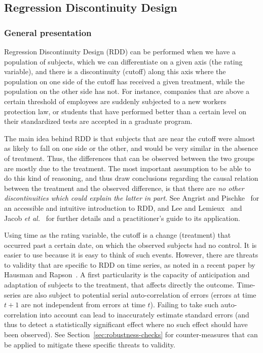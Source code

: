 \subsection{Regression Discontinuity Design}

\label{sec:rdd}

\subsubsection{General presentation}

Regression Discontinuity Design (RDD) can be performed when we have a population of subjects, which we can differentiate on a given axis (the rating variable), and there is a discontinuity (cutoff) along this axis where the population on one side of the cutoff has received a given treatment, while the population on the other side has not. For instance, companies that are above a certain threshold of employees are suddenly subjected to a new workers protection law, or students that have performed better than a certain level on their standardized tests are accepted in a graduate program.

The main idea behind RDD is that subjects that are near the cutoff were almost as likely to fall on one side or the other, and would be very similar in the absence of treatment.
Thus, the differences that can be observed between the two groups are mostly due to the treatment.
The most important assumption to be able to do this kind of reasoning, and thus draw conclusions regarding the causal relation between the treatment and the observed difference, is that there are \emph{no other discontinuities which could explain the latter in part}.
See Angrist and Pischke~\cite{angrist2014mastering,angrist2008mostly} for an accessible and intuitive introduction to RDD, and Lee and Lemieux~\cite{lee2010regression} and Jacob \emph{et al.}~\cite{jacob2012practical} for further details and a practitioner's guide to its application.

Using time as the rating variable, the cutoff is a change (treatment) that occurred past a certain date, on which the observed subjects had no control.
It is easier to use because it is easy to think of such events.
However, there are threats to validity that are specific to RDD on time series, as noted in a recent paper by Hausman and Rapson~\cite{hausman2018regression}.
A first particularity is the capacity of anticipation and adaptation of subjects to the treatment, that affects directly the outcome.
Time-series are also subject to potential serial auto-correlation of errors (errors at time $t+1$ are not independent from errors at time $t$).
Failing to take such auto-correlation into account can lead to inaccurately estimate standard errors (and thus to detect a statistically significant effect where no such effect should have been observed).
See Section~\ref{sec:robustness-checks} for counter-measures that can be applied to mitigate these specific threats to validity.

